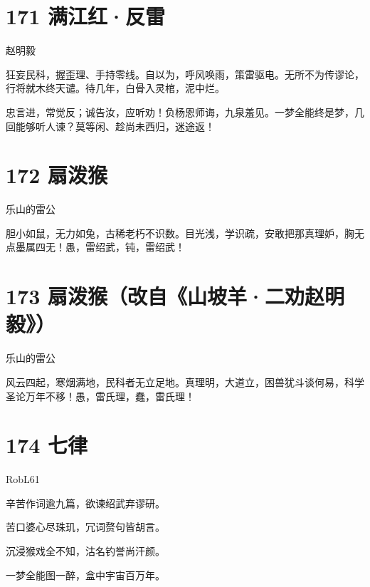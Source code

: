 \documentclass[UTF8,12pt,oneside]{ctexbook}
\begin{document}
        \newpage

        \section{171 满江红·反雷}
        \begin{center}
            赵明毅
        \end{center}
        
        狂妄民科，握歪理、手持零线。自以为，呼风唤雨，策雷驱电。无所不为传谬论，行将就木终天谴。待几年，白骨入灵棺，泥中烂。  
        
        忠言进，常觉反；诚告汝，应听劝！负杨恩师诲，九泉羞见。一梦全能终是梦，几回能够听人谏？莫等闲、趁尚未西归，迷途返！
        ~\\

        \section{172 扇泼猴}
        \begin{center}
            乐山的雷公
        \end{center}
        
        胆小如鼠，无力如兔，古稀老朽不识数。目光浅，学识疏，安敢把那真理妒，胸无点墨属四无！愚，雷绍武，钝，雷绍武！  
        ~\\
        
        \section{173 扇泼猴（改自《山坡羊·二劝赵明毅》）}
        \begin{center}
            乐山的雷公
        \end{center}
        
        风云四起，寒烟满地，民科者无立足地。真理明，大道立，困兽犹斗谈何易，科学圣论万年不移！愚，雷氏理，蠢，雷氏理！

        \newpage
        
        \section{174 七律}
        \begin{center}
            RobL61
        \end{center}

        \begin{center}
        辛苦作词逾九篇，欲谏绍武弃谬研。
        
        苦口婆心尽珠玑，冗词赘句皆胡言。
        
        沉浸猴戏全不知，沽名钓誉尚汗颜。
        
        一梦全能图一醉，盒中宇宙百万年。
        \end{center}
\end{document}
